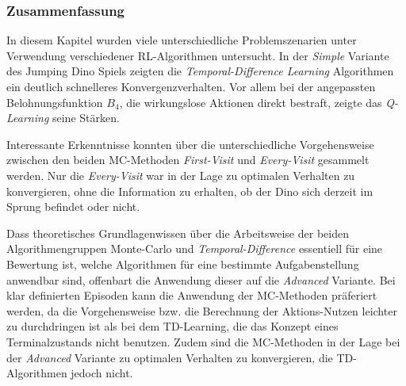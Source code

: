 \subsubsection{Zusammenfassung}
In diesem Kapitel wurden viele unterschiedliche Problemszenarien unter Verwendung verschiedener RL-Algorithmen untersucht. In der \textit{Simple} Variante des Jumping Dino Spiels zeigten die \textit{Temporal-Difference Learning} Algorithmen ein deutlich schnelleres Konvergenzverhalten. Vor allem bei der angepassten Belohnungsfunktion $B_4$, die wirkungslose Aktionen direkt bestraft, zeigte das \textit{Q-Learning} seine Stärken.
\par 
Interessante Erkenntnisse konnten über die unterschiedliche Vorgehensweise zwischen den beiden MC-Methoden \textit{First-Visit} und \textit{Every-Visit} gesammelt werden. Nur die \textit{Every-Visit} war in der Lage zu optimalen Verhalten zu konvergieren, ohne die Information zu erhalten, ob der Dino sich derzeit im Sprung befindet oder nicht.
\par 
Dass theoretisches Grundlagenwissen über die Arbeitsweise der beiden Algorithmengruppen Monte-Carlo und \textit{Temporal-Difference} essentiell für eine Bewertung ist, welche Algorithmen für eine bestimmte Aufgabenstellung anwendbar sind, offenbart die Anwendung dieser auf die \textit{Advanced} Variante. Bei klar definierten Episoden kann die Anwendung der MC-Methoden präferiert werden, da die Vorgehensweise bzw. die Berechnung der Aktions-Nutzen leichter zu durchdringen ist als bei dem TD-Learning, die das Konzept eines Terminalzustands nicht benutzen. Zudem sind die MC-Methoden in der Lage bei der \textit{Advanced} Variante zu optimalen Verhalten zu konvergieren, die TD-Algorithmen jedoch nicht. 